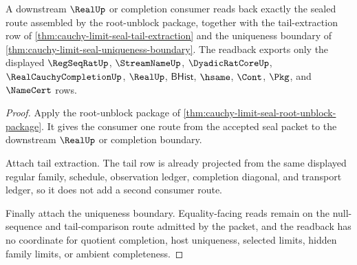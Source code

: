 \begin{theorem}
\label{thm:cauchy-limit-seal-consumer-readback}
A downstream $\RealUp$ or completion consumer reads back exactly the sealed route assembled by the root-unblock package, together with the tail-extraction row of \autoref{thm:cauchy-limit-seal-tail-extraction} and the uniqueness boundary of \autoref{thm:cauchy-limit-seal-uniqueness-boundary}. The readback exports only the displayed $\RegSeqRatUp$, $\StreamNameUp$, $\DyadicRatCoreUp$, $\RealCauchyCompletionUp$, $\RealUp$, $\mathsf{BHist}$, $\hsame$, $\Cont$, $\Pkg$, and $\NameCert$ rows.
\end{theorem}
\begin{proof}
Apply the root-unblock package of \autoref{thm:cauchy-limit-seal-root-unblock-package}. It gives the consumer one route from the accepted seal packet to the downstream $\RealUp$ or completion boundary.

Attach tail extraction. The tail row is already projected from the same displayed regular family, schedule, observation ledger, completion diagonal, and transport ledger, so it does not add a second consumer route.

Finally attach the uniqueness boundary. Equality-facing reads remain on the null-sequence and tail-comparison route admitted by the packet, and the readback has no coordinate for quotient completion, host uniqueness, selected limits, hidden family limits, or ambient completeness.
\end{proof}

